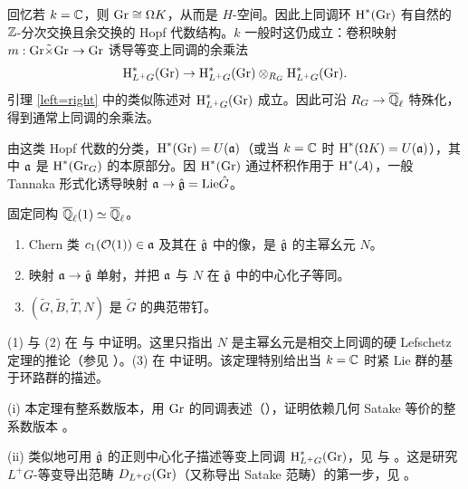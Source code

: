 回忆若 $k={\mathbb C}$，则 ${\operatorname{Gr}}\cong \Omega K$，从而是 $H$-空间。因此上同调环 $\operatorname{H}^*({\operatorname{Gr}})$ 有自然的 ${\mathbb Z}$-分次交换且余交换的 Hopf 代数结构。$k$ 一般时这仍成立：卷积映射 $m:{\operatorname{Gr}}\tilde\times {\operatorname{Gr}}\to {\operatorname{Gr}}$ 诱导等变上同调的余乘法
\[\operatorname{H}^*_{L^+G}({\operatorname{Gr}})\to \operatorname{H}^*_{L^+G}({\operatorname{Gr}})\otimes_{R_G}\operatorname{H}^*_{L^+G}({\operatorname{Gr}}).\]
引理 \ref{left=right} 中的类似陈述对 $\operatorname{H}^*_{L^+G}({\operatorname{Gr}})$ 成立。因此可沿 $R_G\to{\overline{{\mathbb Q}}_\ell}$ 特殊化，得到通常上同调的余乘法。

由这类 Hopf 代数的分类，$\operatorname{H}^*({\operatorname{Gr}})=U({\mathfrak a})$（或当 $k={\mathbb C}$ 时 $\operatorname{H}^*(\Omega K)=U({\mathfrak a})$），其中 ${\mathfrak a}$ 是 $\operatorname{H}^*({\operatorname{Gr}}_G)$ 的本原部分。因 $\operatorname{H}^*({\operatorname{Gr}})$ 通过杯积作用于 $\operatorname{H}^*({\mathcal A})$，一般 Tannaka 形式化诱导映射 ${\mathfrak a}\to \hat {{\mathfrak g}}={\operatorname{Lie}} \hat G$。

\begin{thm}\label{canonical pinning}
固定同构 ${\overline{{\mathbb Q}}_\ell}(1)\simeq {\overline{{\mathbb Q}}_\ell}$。
\begin{enumerate}
\item Chern 类 $c_1({\mathcal O}(1))\in {\mathfrak a}$ 及其在 $\hat {{\mathfrak g}}$ 中的像，是 $\hat {{\mathfrak g}}$ 的主幂幺元 $N$。

\item 映射 ${\mathfrak a}\to\hat{{\mathfrak g}}$ 单射，并把 ${\mathfrak a}$ 与 $N$ 在 $\hat{{\mathfrak g}}$ 中的中心化子等同。

\item $(\tilde G,\tilde B,\tilde T, N)$ 是 $\tilde G$ 的典范带钉。
\end{enumerate}
\end{thm}

(1) 与 (2) 在 \cite[\S 4]{Gi1} 与 \cite{YZ} 中证明。这里只指出 $N$ 是主幂幺元是相交上同调的硬 Lefschetz 定理的推论（参见 \cite[Lemma 4.4.2]{Gi1}）。(3) 在 \cite{YZ} 中证明。该定理特别给出当 $k={\mathbb C}$ 时紧 Lie 群的基于环路群的描述。

\begin{rmk}
(i) 本定理有整系数版本，用 ${\operatorname{Gr}}$ 的同调表述（\cite[Theorem 1.1]{YZ}），证明依赖几何 Satake 等价的整系数版本 \cite{MV}。

(ii) 类似地可用 $\hat{{\mathfrak g}}$ 的正则中心化子描述等变上同调 $\operatorname{H}^*_{L^+G}({\operatorname{Gr}})$，见 \cite[Theorem 2.12]{BFM} 与 \cite[Proposition 6.6]{YZ}。这是研究 $L^+G$-等变导出范畴 $D_{L^+G}({\operatorname{Gr}})$（又称导出 Satake 范畴）的第一步，见 \cite{BF}。
\end{rmk}
